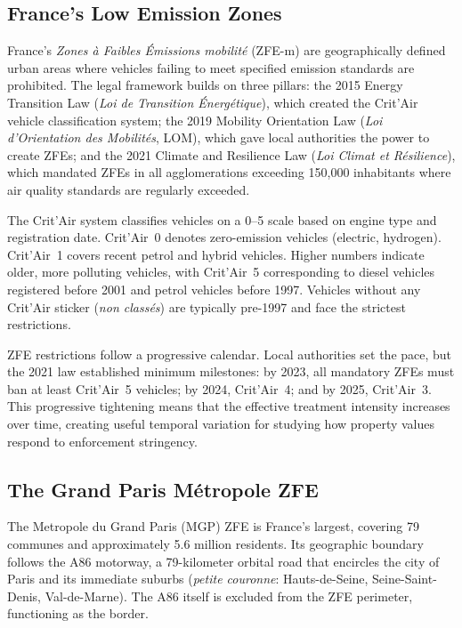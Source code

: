 \documentclass[12pt]{article}
\begin{document}
\subsection{France's Low Emission Zones}

France's \textit{Zones \`a Faibles \'Emissions mobilit\'e} (ZFE-m) are geographically defined urban areas where vehicles failing to meet specified emission standards are prohibited. The legal framework builds on three pillars: the 2015 Energy Transition Law (\textit{Loi de Transition \'Energ\'etique}), which created the Crit'Air vehicle classification system; the 2019 Mobility Orientation Law (\textit{Loi d'Orientation des Mobilit\'es}, LOM), which gave local authorities the power to create ZFEs; and the 2021 Climate and Resilience Law (\textit{Loi Climat et R\'esilience}), which mandated ZFEs in all agglomerations exceeding 150,000 inhabitants where air quality standards are regularly exceeded.

The Crit'Air system classifies vehicles on a 0--5 scale based on engine type and registration date. Crit'Air~0 denotes zero-emission vehicles (electric, hydrogen). Crit'Air~1 covers recent petrol and hybrid vehicles. Higher numbers indicate older, more polluting vehicles, with Crit'Air~5 corresponding to diesel vehicles registered before 2001 and petrol vehicles before 1997. Vehicles without any Crit'Air sticker (\textit{non class\'es}) are typically pre-1997 and face the strictest restrictions.

ZFE restrictions follow a progressive calendar. Local authorities set the pace, but the 2021 law established minimum milestones: by 2023, all mandatory ZFEs must ban at least Crit'Air~5 vehicles; by 2024, Crit'Air~4; and by 2025, Crit'Air~3. This progressive tightening means that the effective treatment intensity increases over time, creating useful temporal variation for studying how property values respond to enforcement stringency.

\subsection{The Grand Paris M\'etropole ZFE}

The Metropole du Grand Paris (MGP) ZFE is France's largest, covering 79 communes and approximately 5.6 million residents. Its geographic boundary follows the A86 motorway, a 79-kilometer orbital road that encircles the city of Paris and its immediate suburbs (\textit{petite couronne}: Hauts-de-Seine, Seine-Saint-Denis, Val-de-Marne). The A86 itself is excluded from the ZFE perimeter, functioning as the border.
\end{document}
